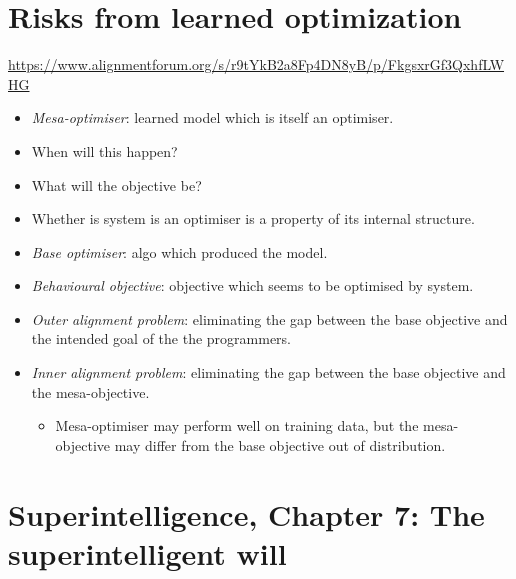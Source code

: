 \section{Risks from learned optimization}

\url{https://www.alignmentforum.org/s/r9tYkB2a8Fp4DN8yB/p/FkgsxrGf3QxhfLWHG}

\begin{itemize}
    \item \emph{Mesa-optimiser}: learned model which is itself an optimiser.
    \item When will this happen?
    \item What will the objective be?
    \item Whether is system is an optimiser is a property of its internal structure.
    \item \emph{Base optimiser}: algo which produced the model.
    \item \emph{Behavioural objective}: objective which seems to be optimised by system.
    \item \emph{Outer alignment problem}: eliminating the gap between the base objective and the intended goal of the the programmers.
    \item \emph{Inner alignment problem}: eliminating the gap between the base objective and the mesa-objective.
    \begin{itemize}
        \item Mesa-optimiser may perform well on training data, but the mesa-objective may differ from the base objective out of distribution.
    \end{itemize}
\end{itemize}


\section{Superintelligence, Chapter 7: The superintelligent will}

